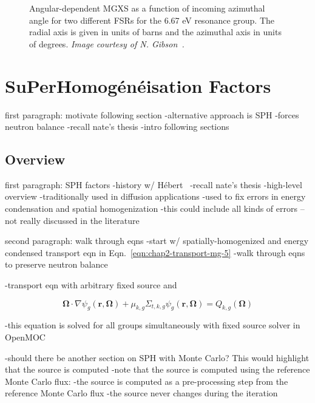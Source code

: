 \begin{figure}[H]
\begin{subfigure}{.5\textwidth}
  \caption{}
\end{subfigure}
\caption[Angular-dependent capture MGXS]{Angular-dependent \ac{MGXS} as a function of incoming azimuthal angle for two different \ac{FSR}s for the 6.67 eV resonance group. The radial axis is given in units of barns and the azimuthal axis in units of degrees. \textit{Image courtesy of N. Gibson~\cite{gibson2016thesis}.}}
\label{fig:chap6-batman-plots}
\end{figure}



\section{SuPerHomog\'{e}n\'{e}isation Factors}
\label{sec:chap6-sph}

first paragraph: motivate following section
-alternative approach is SPH
-forces neutron balance
-recall nate's thesis
-intro following sections

\subsection{Overview}
\label{subsec:chap6-sph-overview}

first paragraph: SPH factors
-history w/ H\'{e}bert~\cite{hebert1993consistent}\cite{hebert2005ribon}
-recall nate's thesis
-high-level overview
-traditionally used in diffusion applications
-used to fix errors in energy condensation and spatial homogenization
  -this could include all kinds of errors -- not really discussed in the literature

second paragraph: walk through eqns
-start w/ spatially-homogenized and energy condensed transport eqn in Eqn.~\ref{eqn:chap2-transport-mg-5}
-walk through eqns to preserve neutron balance

-transport eqn with arbitrary fixed source and 

\begin{dmath}
\label{eqn:chap6-sph-transport-eqn}
\mathbf{\Omega} \cdot \nabla \psi_{g}(\mathbf{r},\mathbf{\Omega}) + \mu_{k,g}\Sigma_{t,k,g}\psi_{g}(\mathbf{r},\mathbf{\Omega}) = Q_{k,g}(\mathbf{\Omega})
\end{dmath}

-this equation is solved for all groups simultaneously with fixed source solver in OpenMOC

-should there be another section on SPH with Monte Carlo? This would highlight that the source is computed
-note that the source is computed using the reference Monte Carlo flux:
-the source is computed as a pre-processing step from the reference Monte Carlo flux
-the source never changes during the iteration

